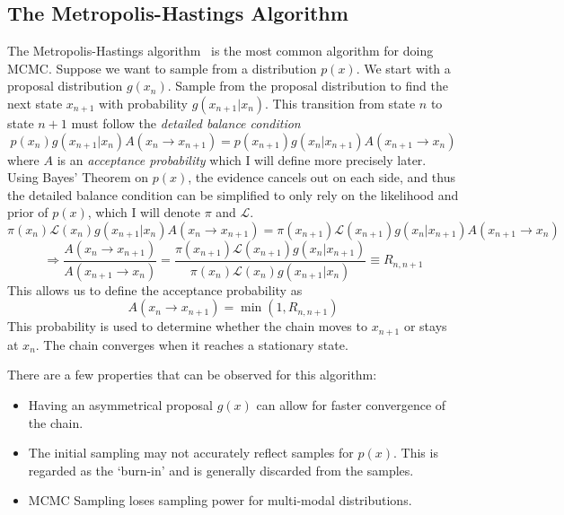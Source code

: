 \subsection{The Metropolis-Hastings Algorithm}
The Metropolis-Hastings algorithm~\cite{tobias_metropolis-hastings_nodate,zhao_bayesian_2021,helsby_monte_nodate} is the most common algorithm for doing MCMC. Suppose we want to sample from a distribution $p(x)$. We start with a proposal distribution $g(x_n)$. 
Sample from the proposal distribution to find the next state $x_{n+1}$ with probability $g(x_{n+1}|x_n)$. 
This transition from state $n$ to state $n+1$ must follow the \textit{detailed balance condition}
\begin{equation}
	p(x_n) g(x_{n+1}|x_n) A(x_n \rightarrow x_{n+1}) = p(x_{n+1}) g(x_n|x_{n+1}) A(x_{n+1} \rightarrow x_{n})
\end{equation}
where $A$ is an \textit{acceptance probability} which I will define more precisely later. 
Using Bayes' Theorem on $p(x)$, the evidence cancels out on each side, 
and thus the detailed balance condition can be simplified to only rely on the likelihood and prior of $p(x)$, 
which I will denote $\pi$ and $\mathcal{L}$.
\begin{equation}
	\pi(x_n)\mathcal{L}(x_n) g(x_{n+1}|x_n) A(x_n \rightarrow x_{n+1}) = \pi(x_{n+1}) \mathcal{L}(x_{n+1}) g(x_{n}|x_{n+1}) A(x_{n+1}\rightarrow x_{n})
\end{equation}
\begin{equation}
	\Rightarrow \frac{A(x_n \rightarrow x_{n+1})}{A(x_{n+1}\rightarrow x_{n})} = \frac{\pi(x_{n+1}) \mathcal{L}(x_{n+1}) g(x_{n}|x_{n+1})}{\pi(x_n)\mathcal{L}(x_n) g(x_{n+1}|x_n)} \equiv R_{n,n+1}
\end{equation}
This allows us to define the acceptance probability as
\begin{equation}
	A(x_n \rightarrow x_{n+1}) = \min( 1, R_{n,n+1} )
\end{equation}
This probability is used to determine whether the chain moves to $x_{n+1}$ or stays at $x_n$. The chain converges when it reaches a stationary state.

There are a few properties that can be observed for this algorithm:
\begin{itemize}
    \item Having an asymmetrical proposal $g(x)$ can allow for faster convergence of the chain.
    \item The initial sampling may not accurately reflect samples for $p(x)$. 
    This is regarded as the `burn-in' and is generally discarded from the samples.
    \item MCMC Sampling loses sampling power for multi-modal distributions. 
\end{itemize}

